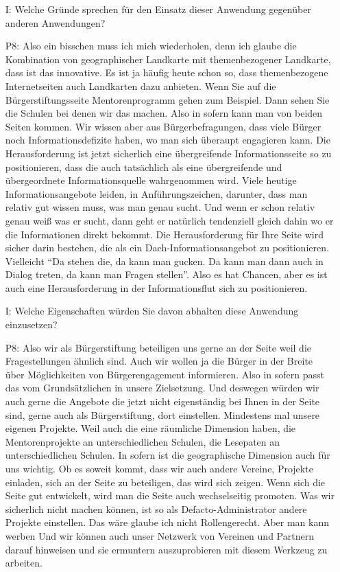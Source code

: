 \begin{itemize}
    \item[I:] Welche Gr{\"u}nde sprechen f{\"u}r den Einsatz dieser Anwendung gegen{\"u}ber anderen Anwendungen?
    \item[P8:] Also ein bisschen muss ich mich wiederholen, denn ich glaube die Kombination von geographischer Landkarte mit themenbezogener Landkarte, dass ist das innovative. Es ist ja h{\"a}ufig heute schon so, dass themenbezogene Internetseiten auch Landkarten dazu anbieten. Wenn Sie auf die B{\"u}rgerstiftungsseite Mentorenprogramm gehen zum Beispiel. Dann sehen Sie die Schulen bei denen wir das machen. Also in sofern kann man von beiden Seiten kommen. Wir wissen aber aus B{\"u}rgerbefragungen, dass viele B{\"u}rger noch Informationsdefizite haben, wo man sich {\"u}beraupt engagieren kann. Die Herausforderung ist jetzt sicherlich eine {\"u}bergreifende Informationsseite so zu positionieren, dass die auch tats{\"a}chlich als eine {\"u}bergreifende und {\"u}bergeordnete Informationsquelle wahrgenommen wird. Viele heutige Informationsangebote leiden, in Anf{\"u}hrungszeichen, darunter, dass man relativ gut wissen muss, was man genau sucht. Und wenn er schon relativ genau wei{\ss} was er sucht, dann geht er nat{\"u}rlich tendenziell gleich dahin wo er die Informationen direkt bekommt. Die Herausforderung f{\"u}r Ihre Seite wird sicher darin bestehen, die als ein Dach-Informationsangebot zu positionieren. Vielleicht "`Da stehen die, da kann man gucken. Da kann man dann auch in Dialog treten, da kann man Fragen stellen"'. Also es hat Chancen, aber es ist auch eine Herausforderung in der Informationsflut sich zu positionieren.
    \item[I:] Welche Eigenschaften w{\"u}rden Sie davon abhalten diese Anwendung einzusetzen?
    \item[P8:] Also wir als B{\"u}rgerstiftung beteiligen uns gerne an der Seite weil die Fragestellungen {\"a}hnlich sind. Auch wir wollen ja die B{\"u}rger in der Breite {\"u}ber M{\"o}glichkeiten von B{\"u}rgerengagement informieren. Also in sofern passt das vom Grunds{\"a}tzlichen in unsere Zielsetzung. Und deswegen w{\"u}rden wir auch gerne die Angebote die jetzt nicht eigenst{\"a}ndig bei Ihnen in der Seite sind, gerne auch als B{\"u}rgerstiftung, dort einstellen. Mindestens mal unsere eigenen Projekte. Weil auch die eine r{\"a}umliche Dimension haben, die Mentorenprojekte an unterschiedlichen Schulen, die Lesepaten an unterschiedlichen Schulen. In sofern ist die geographische Dimension auch f{\"u}r uns wichtig. Ob es soweit kommt, dass wir auch andere Vereine, Projekte einladen, sich an der Seite zu beteiligen, das wird sich zeigen. Wenn sich die Seite gut entwickelt, wird man die Seite auch wechselseitig promoten. Was wir sicherlich nicht machen k{\"o}nnen, ist so als Defacto-Administrator andere Projekte einstellen. Das w{\"a}re glaube ich nicht Rollengerecht. Aber man kann werben Und wir k{\"o}nnen auch unser Netzwerk von Vereinen und Partnern darauf hinweisen und sie ermuntern auszuprobieren mit diesem Werkzeug zu arbeiten.

\end{itemize}
